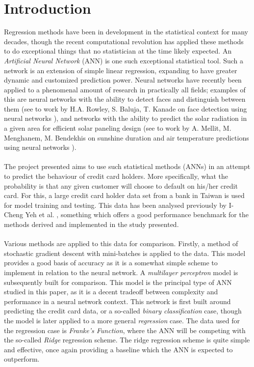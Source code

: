 \section{Introduction}
    Regression methods have been in development in the statistical context for many decades, though the recent computational revolution has applied these methods to do exceptional things that no statistician at the time likely expected. An \textit{Artificial Neural Network} (ANN) is one such exceptional statistical tool. Such a network is an extension of simple linear regression, expanding to have greater dynamic and customized prediction power. Neural networks have recently been applied to a phenomenal amount of research in practically all fields; examples of this are neural networks with the ability to detect faces and distinguish between them (see to work by H.A. Rowley, S. Baluja, T. Kanade on face detection using neural networks \cite{NNWfacedetection}), and networks with the ability to predict the solar radiation in a given area for efficient solar paneling design (see to work by A. Mellit, M. Menghanem, M. Bendekhis on sunshine duration and air temperature predictions using neural networks \cite{NNWsunshine}). \\\\
    The project presented aims to use such statistical methods (ANNs) in an attempt to predict the behaviour of credit card holders. More specifically, what the probability is that any given customer will choose to default on his/her credit card. For this, a large credit card holder data set from a bank in Taiwan is used for model training and testing. This data has been analysed previously by I-Cheng Yeh et al. \cite{CCdata}, something which offers a good performance benchmark for the methods derived and implemented in the study presented.\\\\
    Various methods are applied to this data for comparison. Firstly, a method of stochastic gradient descent with mini-batches is applied to the data. This model provides a good basis of accuracy as it is a somewhat simple scheme to implement in relation to the neural network. 
    A \textit{multilayer perceptron} model is subsequently built for comparison. This model is the principal type of ANN studied in this paper, as it is a decent tradeoff between complexity and performance in a neural network context. This network is first built around predicting the credit card data, or a so-called \textit{binary classification} case, though the model is later applied to a more general \textit{regression} case. The data used for the regression case is \textit{Franke's Function}, where the ANN will be competing with the so-called \textit{Ridge} regression scheme. The ridge regression scheme is quite simple and effective, once again providing a baseline which the ANN is expected to outperform.\\\\
